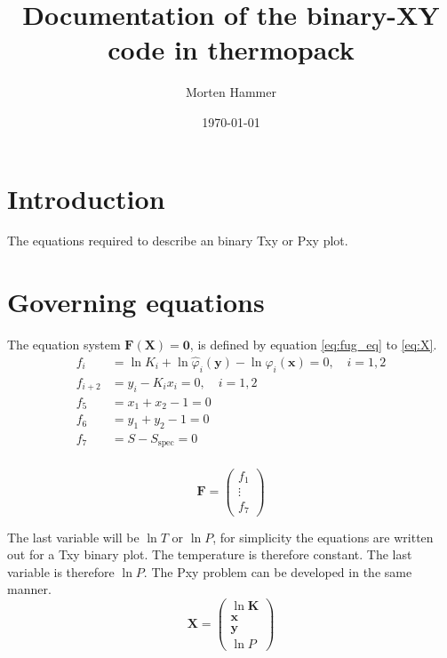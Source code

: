 \documentclass[english]{sintefmemo2012}
\title{Documentation of the binary-XY code in thermopack}
\author{Morten Hammer}
\date{\today}
\newcommand{\spec}{\text{spec}}
\begin{document}
\frontmatter

\tableofcontents

\clearpage

\section{Introduction}
The equations required to describe an binary Txy or Pxy plot.

\section{Governing equations}
\label{sec:eqn}
The equation system $\mathbf{F(X)}=\mathbf{0}$, is defined by equation
\eqref{eq:fug_eq} to \eqref{eq:X}.
\begin{align}
 f_i  & = \ln K_i + \ln \hat{\varphi}_i\left(\mathbf{y}\right)- \ln
 \hat{\varphi}_i\left(\mathbf{x}\right) = 0, \quad
 i=1,2 \label{eq:fug_eq} \\
 f_{i+2}  & = y_i - K_i x_i = 0, \quad i=1,2 \label{eq:k_eq} \\
 f_{5}  & = x_1 + x_2 - 1 = 0 \label{eq:x_eq} \\
 f_{6}  & = y_1 + y_2 - 1 = 0 \label{eq:y_eq} \\
 f_{7}  & = S - S_{\spec} = 0 \label{eq:spec_eq} \\
\end{align}

\begin{equation}
\label{eq:F}
 \mathbf{F} = \begin{pmatrix}
          f_1 \\
          \vdots \\
          f_7
\end{pmatrix}
\end{equation}

The last variable will be $\ln T$ or $\ln P$, for simplicity the
equations are written out for a Txy binary plot. The temperature is
therefore constant. The last variable is therefore $\ln P$. The Pxy
problem can be developed in the same manner.   
\begin{equation}
\label{eq:X}
 \mathbf{X} = \begin{pmatrix}
          \ln \mathbf{K} \\
          \mathbf{x} \\
          \mathbf{y} \\
          \ln P
\end{pmatrix}
\end{equation}
\end{document}
